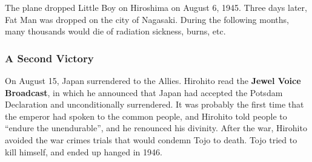 The plane dropped Little Boy on Hiroshima on August 6, 1945.
Three days later, Fat Man was dropped on the city of Nagasaki.
During the following months, many thousands would die of radiation sickness, burns, etc.

\subsubsection*{A Second Victory}

On August 15, Japan surrendered to the Allies.
Hirohito read the \textbf{Jewel Voice Broadcast},
in which he announced that Japan had accepted the Potsdam Declaration and unconditionally surrendered.
It was probably the first time that the emperor had spoken to the common people,
and Hirohito told people to ``endure the unendurable'', and he renounced his divinity.
After the war, Hirohito avoided the war crimes trials that would condemn Tojo to death.
Tojo tried to kill himself, and ended up hanged in 1946.


